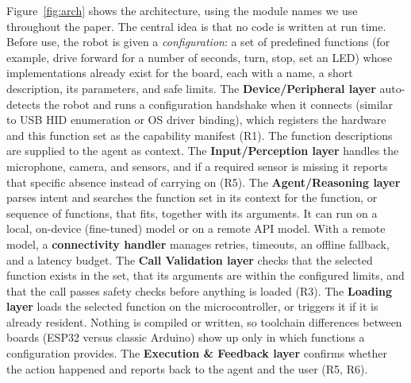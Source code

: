 \documentclass[sigconf]{acmart}
\begin{document}
Figure~\ref{fig:arch} shows the architecture, using the module names we use throughout the paper. The central idea is that no code is written at run time. Before use, the robot is given a \emph{configuration}: a set of predefined functions (for example, drive forward for a number of seconds, turn, stop, set an LED) whose implementations already exist for the board, each with a name, a short description, its parameters, and safe limits. The \textbf{Device/Peripheral layer} auto-detects the robot and runs a configuration handshake when it connects (similar to USB HID enumeration or OS driver binding), which registers the hardware and this function set as the capability manifest (R1). The function descriptions are supplied to the agent as context. The \textbf{Input/Perception layer} handles the microphone, camera, and sensors, and if a required sensor is missing it reports that specific absence instead of carrying on (R5). The \textbf{Agent/Reasoning layer} parses intent and searches the function set in its context for the function, or sequence of functions, that fits, together with its arguments. It can run on a local, on-device (fine-tuned) model or on a remote API model. With a remote model, a \textbf{connectivity handler} manages retries, timeouts, an offline fallback, and a latency budget. The \textbf{Call Validation layer} checks that the selected function exists in the set, that its arguments are within the configured limits, and that the call passes safety checks before anything is loaded (R3). The \textbf{Loading layer} loads the selected function on the microcontroller, or triggers it if it is already resident. Nothing is compiled or written, so toolchain differences between boards (ESP32 versus classic Arduino) show up only in which functions a configuration provides. The \textbf{Execution \& Feedback layer} confirms whether the action happened and reports back to the agent and the user (R5, R6).
\end{document}
